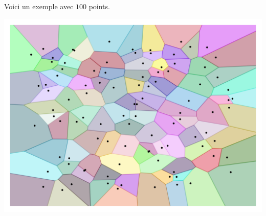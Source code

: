 \documentclass[11pt,class=report,crop=false]{standalone}
\begin{document}
Voici un exemple avec $100$ points.
\begin{center}
	\includegraphics[scale=\myscale,scale=0.7]{figures/voronoi02b}	
\end{center}
\end{document}
